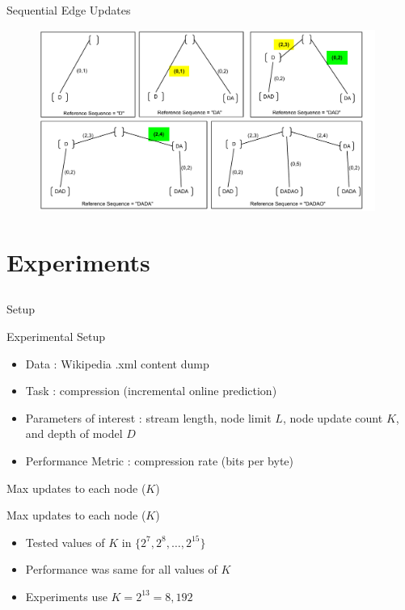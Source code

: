 \documentclass{beamer}
\begin{document}
\begin{frame}[t]{Sequential Edge Updates}
   	\begin{figure}[t]
		\begin{center}
			\includegraphics[width = 11cm]{../figs/DADAO.pdf}
		\end{center}
	\end{figure}
\end{frame}


\section{Experiments}
\subsection{}

\begin{frame}[t]{Setup}
	\begin{block}{Experimental Setup}
		\begin{itemize}
			\item Data : Wikipedia .xml content dump
			\item Task : compression (incremental online prediction)
			\item Parameters of interest : stream length, node limit $L$, node update count $K$, and depth of model $D$
			\item Performance Metric : compression rate (bits per byte)
		\end{itemize}
	\end{block}
\end{frame}

\begin{frame}[t]{Max updates to each node ($K$)}
	\begin{block}{Max updates to each node ($K$)}
		\begin{itemize}
			\item Tested values of $K$ in $\{2^7, 2^8, \ldots, 2^{15} \}$
			\item Performance was same for all values of $K$
			\item Experiments use $K = 2^{13} = 8,192$
		\end{itemize}
	\end{block}
\end{frame}
\end{document}
